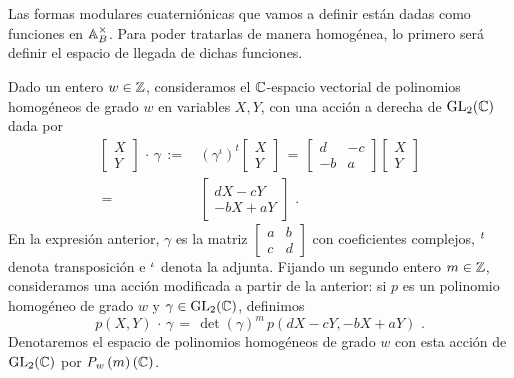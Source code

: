 
Las formas modulares cuaterni\'{o}nicas que vamos a definir est\'{a}n
dadas como funciones en $\mathbb{A}_{B}^{\times}$. Para poder tratarlas de manera
homog\'{e}nea, lo primero ser\'{a} definir el espacio de llegada de dichas
funciones.

Dado un entero $w\in\mathbb{Z}$, consideramos el $\mathbb{C}$-espacio vectorial de
polinomios homog\'{e}neos de grado $w$ en variables $X,Y$, con una acci\'{o}n a
derecha de $\mathrm{GL}_{2}(\mathbb{C})$ dada por
\begin{equation}
	\label{eq:accionenpolinomioshomogeneos}
\begin{aligned}
	\begin{bmatrix} X \\ Y \end{bmatrix}\,\cdot\,\gamma \,:=\, &
		(\gamma^{\iota})^{t}\begin{bmatrix} X \\ Y \end{bmatrix}
		\,=\, \begin{bmatrix} d & -c \\ -b & a \end{bmatrix}
			\begin{bmatrix} X \\ Y \end{bmatrix} \\
	\,=\, & \begin{bmatrix} d X - c Y \\ -b X + a Y \end{bmatrix}
	\text{ .}
\end{aligned}
\end{equation}
%
En la expresi\'{o}n anterior, $\gamma$ es la matriz
\begin{math}
	\begin{bmatrix} a & b \\ c & d \end{bmatrix}
\end{math}
con coeficientes complejos, $\null^{t}$ denota transposici\'{o}n e
$\null^{\iota}$ denota la adjunta.
Fijando un segundo entero $m\in\mathbb{Z}$, consideramos una acci\'{o}n modificada
a partir de la anterior: si $p$ es un polinomio homog\'{e}neo de grado $w$ y
$\gamma\in\mathrm{GL}_{2}(\mathbb{C})$, definimos
\begin{equation}
	\label{eq:accionenpolinomioscontwist}
	p(X,Y)\,\cdot\,\gamma \,=\,\det(\gamma)^{m}\,p(dX-cY,-bX+aY)
	\text{ .}
\end{equation}
%
Denotaremos el espacio de polinomios homog\'{e}neos de grado $w$ con esta
acci\'{o}n de $\mathrm{GL}_{2}(\mathbb{C})$ por $\mathit{P}_{w}\left(m\right)(\mathbb{C})$.

